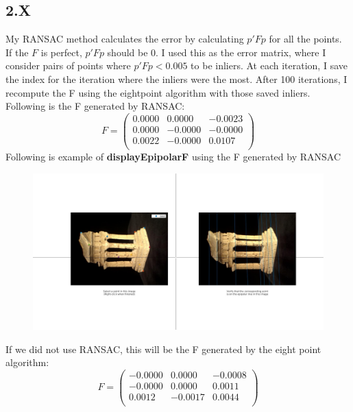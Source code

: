\documentclass{article}
\begin{document}
\subsection*{2.X}
My RANSAC method calculates the error by calculating $p'Fp$ for all the points. If the $F$ is perfect, $p'Fp$ should be $0$. I used this as the error matrix, where I consider pairs of points where $p'Fp < 0.005$ to be inliers. At each iteration, I save the index for the iteration where the inliers were the most. After 100 iterations, I recompute the F using the eightpoint algorithm with those saved inliers.\\
Following is the F generated by RANSAC:
\begin{equation*}
F = 
\begin{pmatrix}
    0.0000  &  0.0000&   -0.0023\\
    0.0000   &-0.0000&   -0.0000\\
    0.0022   &-0.0000&    0.0107\\
\end{pmatrix}
\end{equation*}
Following is example of \textbf{displayEpipolarF} using the F generated by RANSAC
\begin{figure}[H]
    \centering
    \includegraphics[width=6.5in]{./figures/randsac}
\end{figure}
If we did not use RANSAC, this will be the F generated by the eight point algorithm:
\begin{equation*}
F = 
\begin{pmatrix}
   -0.0000  &  0.0000&   -0.0008\\
   -0.0000  &  0.0000&    0.0011\\
    0.0012  & -0.0017&    0.0044\\
\end{pmatrix}
\end{equation*}
\end{document}
